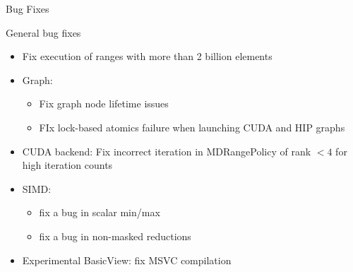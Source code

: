 




\begin{frame}[fragile]

  {\Huge Bug Fixes}

  \vspace{10pt}

\end{frame}

\begin{frame}[fragile]{General bug fixes}
  \begin{itemize}
      \item Fix execution of ranges with more than 2 billion elements
      \item Graph:
      \begin{itemize}
        \item Fix graph node lifetime issues
        \item FIx lock-based atomics failure when launching CUDA and HIP graphs
      \end{itemize}
      \item CUDA backend: Fix incorrect iteration in MDRangePolicy of rank $< 4$ for high iteration counts
      \item SIMD:
      \begin{itemize}
        \item fix a bug in scalar min/max
        \item fix a bug in non-masked reductions
      \end{itemize}
      \item Experimental BasicView: fix MSVC compilation
  \end{itemize}
 \end{frame}

